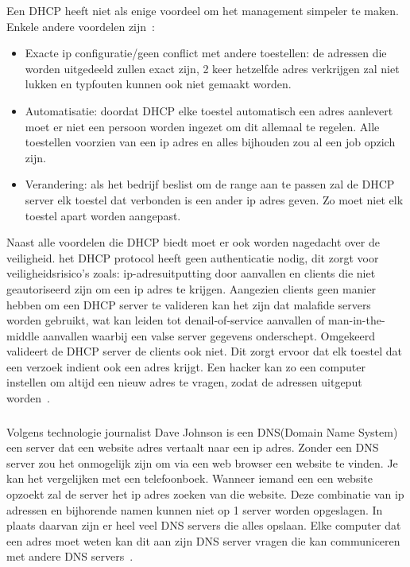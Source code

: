 Een DHCP heeft niet als enige voordeel om het management simpeler te maken. Enkele andere voordelen zijn~\autocite{Kerravala2018}:
\begin{itemize}
    \item Exacte ip configuratie/geen conflict met andere toestellen: de adressen die worden uitgedeeld zullen exact zijn, 2 keer hetzelfde adres verkrijgen zal niet lukken en typfouten kunnen ook niet gemaakt worden.
    \item Automatisatie: doordat DHCP elke toestel automatisch een adres aanlevert moet er niet een persoon worden ingezet om dit allemaal te regelen. Alle toestellen voorzien van een ip adres en alles bijhouden zou al een job opzich zijn. 
    \item Verandering: als het bedrijf beslist om de range aan te passen zal de DHCP server elk toestel dat verbonden is een ander ip adres geven. Zo moet niet elk toestel apart worden aangepast.
\end{itemize}

Naast alle voordelen die DHCP biedt moet er ook worden nagedacht over de veiligheid. het DHCP protocol heeft geen authenticatie nodig, dit zorgt voor veiligheidsrisico's zoals: ip-adresuitputting door aanvallen en clients die niet geautoriseerd zijn om een ip adres te krijgen. Aangezien clients geen manier hebben om een DHCP server te valideren kan het zijn dat malafide servers worden gebruikt, wat kan leiden tot denail-of-service aanvallen of man-in-the-middle aanvallen waarbij een valse server gegevens onderschept. Omgekeerd valideert de DHCP server de clients ook niet. Dit zorgt ervoor dat elk toestel dat een verzoek indient ook een adres krijgt. Een hacker kan zo een computer instellen om altijd een nieuw adres te vragen, zodat de adressen uitgeput worden~\autocite{Kerravala2018}.
\subsubsection{}
\label{subsubsec:DNS-server}
Volgens technologie journalist Dave Johnson is een DNS(Domain Name System) een server dat een website adres vertaalt naar een ip adres. Zonder een DNS server zou het onmogelijk zijn om via een web browser een website te vinden. Je kan het vergelijken met een telefoonboek. Wanneer iemand een een website opzoekt zal de server het ip adres zoeken van die website. Deze combinatie van ip adressen en bijhorende namen kunnen niet op 1 server worden opgeslagen. In plaats daarvan zijn er heel veel DNS servers die alles opslaan. Elke computer dat een adres moet weten kan dit aan zijn DNS server vragen die kan communiceren met andere DNS servers~\autocite{Johnson2021}. 

